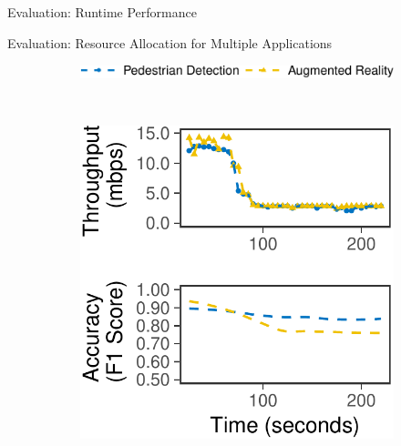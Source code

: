 \begin{frame}{Evaluation: Runtime Performance}
\end{frame}

\begin{frame}{Evaluation: Resource Allocation for Multiple Applications}
  \centering
  \begin{figure}
    \centering
    \begin{subfigure}[t]{0.7\columnwidth}
      \centering
      \includegraphics[width=\textwidth]{figures/multitask-legend.pdf}
    \end{subfigure}
    \\
    \vspace{1em}
    \begin{subfigure}[t]{0.45\columnwidth}
      \centering
      \includegraphics[width=\textwidth]{figures/multitask-left.pdf}

\end{subfigure}
\end{figure}
\end{frame}
